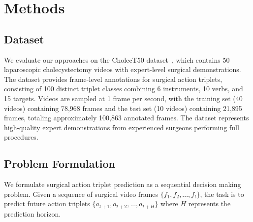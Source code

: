 \documentclass[runningheads]{llncs}
\begin{document}


\section{Methods}

\subsection{Dataset}

We evaluate our approaches on the CholecT50 dataset~\cite{nwoye2022cholect50}, which contains 50 laparoscopic cholecystectomy videos with expert-level surgical demonstrations. The dataset provides frame-level annotations for surgical action triplets, consisting of 100 distinct triplet classes combining 6 instruments, 10 verbs, and 15 targets. Videos are sampled at 1 frame per second, with the training set (40 videos) containing 78,968 frames and the test set (10 videos) containing 21,895 frames, totaling approximately 100,863 annotated frames. The dataset represents high-quality expert demonstrations from experienced surgeons performing full procedures.

\subsection{Problem Formulation}

We formulate surgical action triplet prediction as a sequential decision making problem. Given a sequence of surgical video frames $\{f_1, f_2, ..., f_t\}$, the task is to predict future action triplets $\{a_{t+1}, a_{t+2}, ..., a_{t+H}\}$ where $H$ represents the prediction horizon.
\end{document}
